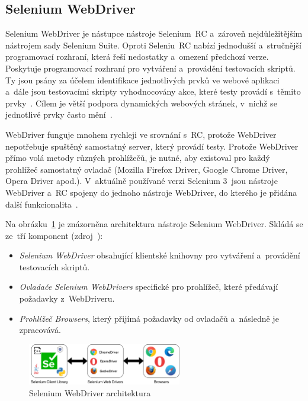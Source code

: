\subsection*{Selenium WebDriver}
\label{sec:selenium_webdriver}
Selenium WebDriver je nástupce nástroje Selenium~RC a~zároveň nejdůležitějším nástrojem sady Selenium Suite. Oproti Seleniu~RC nabízí jednodušší a~stručnější programovací rozhraní, která řeší nedostatky a~omezení předchozí verze. Poskytuje programovací rozhraní pro vytváření a~provádění testovacích skriptů. Ty jsou psány za účelem identifikace jednotlivých prvků ve webové aplikaci a~dále jsou testovacími skripty vyhodnocovány akce, které testy provádí s~těmito prvky~\cite{bib:selenium_grid}. Cílem je větší podpora dynamických webových stránek, v~nichž se jednotlivé prvky často mění~\cite{bib:selenium_tool_suite}.

WebDriver funguje mnohem rychleji ve srovnání s~RC, protože WebDriver nepotřebuje spuštěný samostatný server, který provádí testy. Protože WebDriver přímo volá metody různých prohlížečů, je nutné, aby existoval pro každý prohlížeč samostatný ovladač (Mozilla Firefox Driver, Google Chrome Driver, Opera Driver apod.). V~aktuálně používané verzi Selenium 3~jsou nástroje WebDriver a~RC spojeny do jednoho nástroje WebDriver, do kterého je přidána další funkcionalita~\cite{bib:selenium_tool_suite}.

Na obrázku~\ref{img:selenium_webdriver} je znázorněna architektura nástroje Selenium WebDriver. Skládá se ze~tří komponent (zdroj~\cite{bib:selenium_webdrivers}): 
\begin{itemize}
  \item \textit{Selenium WebDriver} obsahující klientské knihovny pro vytváření a~provádění testovacích skriptů.
  \item \textit{Ovladače Selenium WebDrivers} specifické pro prohlížeč, které předávají požadavky z~WebDriveru.
  \item \textit{Prohlížeč Browsers}, který přijímá požadavky od ovladačů a~následně je zpracovává.
\end{itemize}

\begin{figure}[hbt]
	\centering
	\includegraphics[width=0.6\textwidth]{images/selenium_webdriver.jpg}
	\caption{Selenium WebDriver architektura}
	\label{img:selenium_webdriver}
\end{figure}


